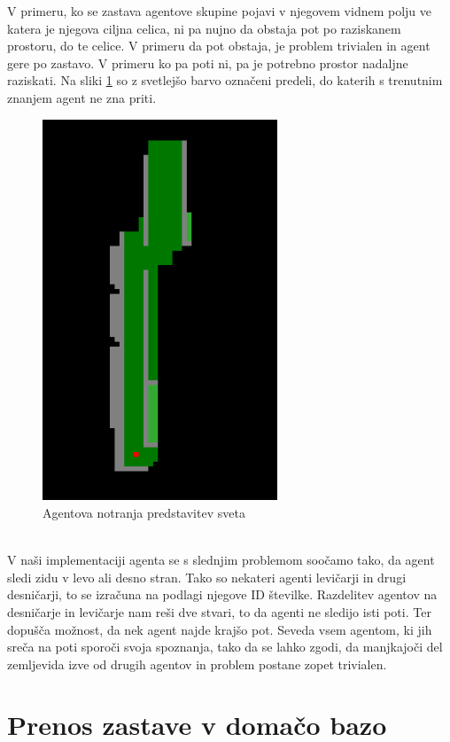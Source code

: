 \documentclass[12pt,a4paper,openany]{book}
\begin{document}
V primeru, ko se zastava agentove skupine pojavi v njegovem vidnem polju ve katera je njegova ciljna celica, 
ni pa nujno da obstaja pot po raziskanem prostoru, do te celice. V primeru da pot obstaja, je problem trivialen 
in agent gere po zastavo. V primeru ko pa poti ni, pa je potrebno prostor nadaljne raziskati. Na sliki \ref{grupe}
 so z svetlejšo barvo označeni predeli, do katerih s trenutnim znanjem agent ne zna priti.\\
\begin{figure}[ht]
 \centering
 \includegraphics[width=7cm]{./pictures/Grupe.png}
 \caption[Agentova predstavitev sveta]{Agentova notranja predstavitev sveta}
 \label{grupe}
\end{figure}
\\
V naši implementaciji agenta se s slednjim problemom soočamo tako, da agent sledi zidu v levo ali desno stran. 
Tako so nekateri agenti levičarji in drugi desničarji, to se izračuna na podlagi njegove ID številke. Razdelitev 
agentov na desničarje in levičarje nam reši dve stvari, to da agenti ne sledijo isti poti. Ter dopušča možnost, 
da nek agent najde krajšo pot. Seveda vsem agentom, ki jih sreča na poti sporoči svoja spoznanja, tako da se lahko 
zgodi, da manjkajoči del zemljevida izve od drugih agentov in problem postane zopet trivialen.


\section{Prenos zastave v domačo bazo}
\end{document}

